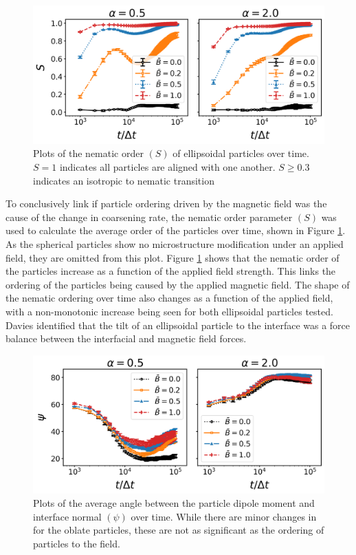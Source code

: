 \begin{figure}
    \centering
    \includegraphics[scale = 0.5]{figures/results/paper1/S-vs-t.png}
    \caption{Plots of the nematic order $(S)$ of ellipsoidal particles over time. $S = 1$ indicates all particles are aligned with one another. $S \geq 0.3$ indicates an isotropic to nematic transition \cite{veerman_phase_1992}}
    \label{fig:P1_nematic}
\end{figure}

To conclusively link if particle ordering driven by the magnetic field was the cause of the change in coarsening rate, the nematic order parameter $(S)$ was used to calculate the average order of the particles over time, shown in Figure \ref{fig:P1_nematic}. As the spherical particles show no microstructure modification under an applied field, they are omitted from this plot. Figure \ref{fig:P1_nematic} shows that the nematic order of the particles increase as a function of the applied field strength. This links the ordering of the particles being caused by the applied magnetic field. The shape of the nematic ordering over time also changes as a function of the applied field, with a non-monotonic increase being seen for both ellipsoidal particles tested. Davies identified that the tilt of an ellipsoidal particle to the interface was a force balance between the interfacial and magnetic field forces. \cite{davies_interface_2014} 

\begin{figure}
    \centering
    \includegraphics[scale = 0.5]{figures/results/paper1/psi-vs-t.png}
    \caption{Plots of the average angle between the particle dipole moment and interface normal $(\psi)$ over time. While there are minor changes in for the oblate particles, these are not as significant as the ordering of particles to the field.}
    \label{fig:P1_particle-angle}
\end{figure}

